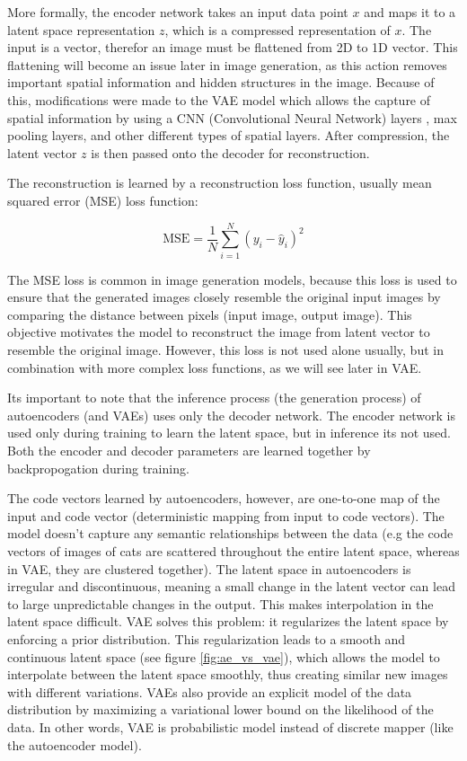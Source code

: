 More formally, the encoder network takes an input data point $x$ and maps it to a latent space representation $z$, which is a compressed representation of $x$. The input is a vector, therefor an image must be flattened from 2D to 1D vector. This flattening will become an issue later in image generation, as this action removes important spatial information and hidden structures in the image. Because of this, modifications were made to the VAE model which allows the capture of spatial information by using a CNN (Convolutional Neural Network) \cite{cnn} layers \cite{vae_cnn_example}, max pooling layers, and other different types of spatial layers. After compression, the latent vector $z$ is then passed onto the decoder for reconstruction. 

The reconstruction is learned by a reconstruction loss function, usually mean squared error (MSE) loss function:

\begin{equation}
    \text{MSE} = \frac{1}{N} \sum_{i=1}^{N} (y_i - \hat{y}_i)^2
\label{eq:mse}
\end{equation}

The MSE loss is common in image generation models, because this loss is used to ensure that the generated images closely resemble the original input images by comparing the distance between pixels (input image, output image). This objective motivates the model to reconstruct the image from latent vector to resemble the original image. However, this loss is not used alone usually, but in combination with more complex loss functions, as we will see later in VAE.

Its important to note that the inference process (the generation process) of autoencoders (and VAEs) uses only the decoder network. The encoder network is used only during training to learn the latent space, but in inference its not used. Both the encoder and decoder parameters are learned together by backpropogation during training.

The code vectors learned by autoencoders, however, are one-to-one map of the input and code vector (deterministic mapping from input to code vectors). The model doesn't capture any semantic relationships between the data (e.g the code vectors of images of cats are scattered throughout the entire latent space, whereas in VAE, they are clustered together). The latent space in autoencoders is irregular and discontinuous, meaning a small change in the latent vector can lead to large unpredictable changes in the output. This makes interpolation in the latent space difficult. VAE solves this problem: it regularizes the latent space by enforcing a prior distribution. This regularization leads to a smooth and continuous latent space (see figure \ref{fig:ae_vs_vae}), which allows the model to interpolate between the latent space smoothly, thus creating similar new images with different variations. VAEs also provide an explicit model of the data distribution by maximizing a variational lower bound on the likelihood of the data. In other words, VAE is probabilistic model instead of discrete mapper (like the autoencoder model).

